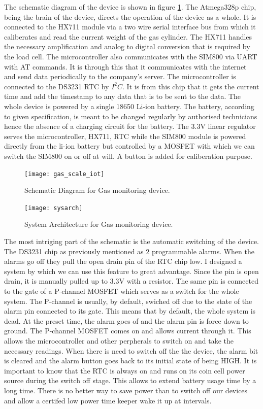 The schematic diagram of the device is shown in figure \ref{fig:gas_scale_iot}. The Atmega328p chip, being the brain of the device, directs the operation of the device as a whole. It is connected to the HX711 module via a two wire serial interface bus from which it caliberates and read the current weight of the gas cylinder. The HX711 handles the necessary amplification and analog to digital conversion that is required by the load cell. The microcontroller also communicates with the SIM800 via UART with AT commands. It is through this that it communicates with the internet and send data periodically to the company's server. The microcontroller is connected to the DS3231 RTC by $I^2C$. It is from this chip that it gets the current time and add the timestamp to any data that is to be sent to the data. The whole device is powered by a single 18650 Li-ion battery. The battery, according to given specification, is meant to be changed regularly by authorised technicians hence the absence of a charging circuit for the battery. The 3.3V linear regulator serves the microcontroller, HX711, RTC while the SIM800 module is powered directly from the li-ion battery but controlled by a MOSFET with which we can switch the SIM800 on or off at will. A button is added for caliberation purpose.


\begin{figure}
    \centering
    \texttt{[image: gas\_scale\_iot]}
	\caption{Schematic Diagram for Gas monitoring device.}
    \label{fig:gas_scale_iot}
\end{figure}


\begin{figure}[p]
\texttt{[image: sysarch]}
\centering
\caption{System Architecture for Gas monitoring device.}
\centering
\label{fig:sysarch}

\end{figure}

The most intriging part of the schematic is the automatic switching of the device. The DS3231 chip as previously mentioned as 2 programmable alarms. When the alarms go off they pull the open drain pin of the RTC chip low. I designed a system by which we can use this feature to great advantage. Since the pin is open drain, it is manually pulled up to 3.3V with a resistor. The same pin is connected to the gate of a P-channel MOSFET which serves as a switch for the whole system. The P-channel is usually, by default, swiched off due to the state of the alarm pin connected to its gate. This means that by default, the whole system is dead. At the preset time, the alarm goes of and the alarm pin is force down to ground. The P-channel MOSFET comes on and allows current through it. This allows the microcontroller and other perpherals to switch on and take the necessary readings. When there is need to switch off the the device, the alarm bit is cleared and the alarm button goes back to its initial state of being HIGH.
It is important to know that the RTC is always on and runs on its coin cell power source during the switch off stage. This allows to extend battery usage time by a long time. There is no better way to save power than to switch off our devices and allow a certifed low power time keeper wake it up at intervals. 


